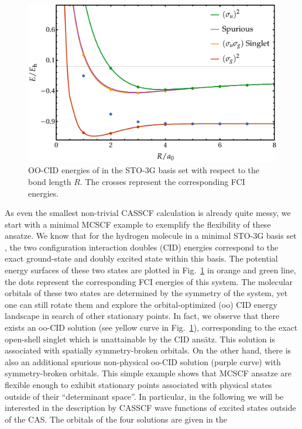 \documentclass[aps,prb,reprint,showkeys,superscriptaddress]{revtex4-1}
\begin{document}
\begin{figure}
  \centering
  \includegraphics[width=\linewidth]{Figures/fig_1.pdf}
  \caption{
    OO-CID energies of  in the STO-3G basis set with respect to the bond length $R$. The crosses represent the corresponding FCI energies.
    \label{fig:fig_1}}
\end{figure}

As even the smallest non-trivial CASSCF calculation is already quite messy, we start with a minimal MCSCF example to exemplify the flexibility of these ansatze.
We know that for the hydrogen molecule in a minimal STO-3G basis set \cite{Hehre_1969}, the two configuration interaction doubles (CID) energies correspond to the exact ground-state and doubly excited state within this basis.
The potential energy surfaces of these two states are plotted in Fig.~\ref{fig:fig_1} in orange and green line, the dots represent the corresponding FCI energies of this system.
The molecular orbitals of these two states are determined by the symmetry of the system, yet one can still rotate them and explore the orbital-optimized (oo) CID energy landscape in search of other stationary points.
In fact, we observe that there exists an oo-CID solution (see yellow curve in Fig.~\ref{fig:fig_1}), corresponding to the exact open-shell singlet which is unattainable by the CID ansätz.
This solution is associated with spatially symmetry-broken orbitals.
On the other hand, there is also an additional spurious non-physical oo-CID solution (purple curve) with symmetry-broken orbitals.
This simple example shows that MCSCF ansatze are flexible enough to exhibit stationary points associated with physical states outside of their ``determinant space''.
In particular, in the following we will be interested in the description by CASSCF wave functions of excited states outside of the CAS.
The orbitals of the four solutions are given in the \SupInf
\end{document}
